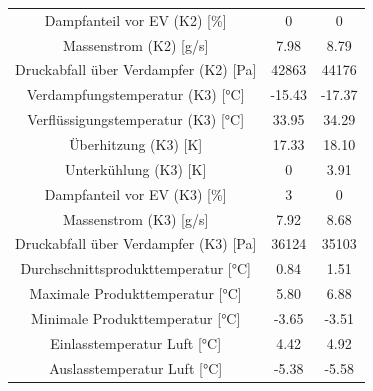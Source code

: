 \begin{table}[h!]
\begin{tabular}{|ccc|}
\multicolumn{1}{|c|}{Dampfanteil vor EV (K2) {[}\%{]}}          & \multicolumn{1}{c|}{0}      & 0             \\
\multicolumn{1}{|c|}{Massenstrom (K2) {[}g/s{]}}                & \multicolumn{1}{c|}{7.98}   & 8.79          \\
\multicolumn{1}{|c|}{Druckabfall über Verdampfer (K2) {[}Pa{]}} & \multicolumn{1}{c|}{42863}  & 44176         \\ \hline
\multicolumn{1}{|c|}{Verdampfungstemperatur (K3) {[}°C{]}}      & \multicolumn{1}{c|}{-15.43} & -17.37        \\
\multicolumn{1}{|c|}{Verflüssigungstemperatur (K3) {[}°C{]}}    & \multicolumn{1}{c|}{33.95}  & 34.29         \\
\multicolumn{1}{|c|}{Überhitzung (K3) {[}K{]}}                  & \multicolumn{1}{c|}{17.33}  & 18.10         \\
\multicolumn{1}{|c|}{Unterkühlung (K3) {[}K{]}}                 & \multicolumn{1}{c|}{0}      & 3.91          \\
\multicolumn{1}{|c|}{Dampfanteil vor EV (K3) {[}\%{]}}          & \multicolumn{1}{c|}{3}      & 0             \\
\multicolumn{1}{|c|}{Massenstrom (K3) {[}g/s{]}}                & \multicolumn{1}{c|}{7.92}   & 8.68          \\
\multicolumn{1}{|c|}{Druckabfall über Verdampfer (K3) {[}Pa{]}} & \multicolumn{1}{c|}{36124}  & 35103         \\ \hline
\multicolumn{1}{|c|}{Durchschnittsprodukttemperatur {[}°C{]}}   & \multicolumn{1}{c|}{0.84}   & 1.51          \\
\multicolumn{1}{|c|}{Maximale Produkttemperatur {[}°C{]}}       & \multicolumn{1}{c|}{5.80}   & 6.88          \\
\multicolumn{1}{|c|}{Minimale Produkttemperatur {[}°C{]}}       & \multicolumn{1}{c|}{-3.65}  & -3.51         \\
\multicolumn{1}{|c|}{Einlasstemperatur Luft {[}°C{]}}           & \multicolumn{1}{c|}{4.42}   & 4.92          \\
\multicolumn{1}{|c|}{Auslasstemperatur Luft {[}°C{]}}           & \multicolumn{1}{c|}{-5.38}  & -5.58         \\ \hline
\end{tabular}
\end{table}

